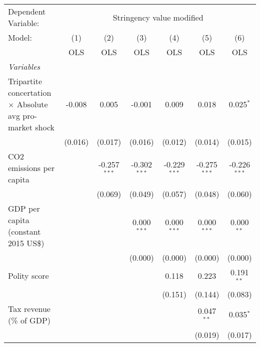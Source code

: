 
\begingroup
\centering
\begin{tabular}{lcccccc}
   \toprule
   Dependent Variable: & \multicolumn{6}{c}{Stringency value modified}\\
   Model:                                                          & (1)     & (2)            & (3)            & (4)            & (5)            & (6)\\  
                                                                   &  OLS    & OLS            & OLS            & OLS            & OLS            & OLS\\  
   \midrule
   \emph{Variables}\\
   Tripartite concertation $\times$ Absolute avg pro-market shock  & -0.008  & 0.005          & -0.001         & 0.009          & 0.018          & 0.025$^{*}$\\   
                                                                   & (0.016) & (0.017)        & (0.016)        & (0.012)        & (0.014)        & (0.015)\\   
   CO2 emissions per capita                                        &         & -0.257$^{***}$ & -0.302$^{***}$ & -0.229$^{***}$ & -0.275$^{***}$ & -0.226$^{***}$\\   
                                                                   &         & (0.069)        & (0.049)        & (0.057)        & (0.048)        & (0.060)\\   
   GDP per capita (constant 2015 US\$)                             &         &                & 0.000$^{***}$  & 0.000$^{***}$  & 0.000$^{***}$  & 0.000$^{**}$\\   
                                                                   &         &                & (0.000)        & (0.000)        & (0.000)        & (0.000)\\   
   Polity score                                                    &         &                &                & 0.118          & 0.223          & 0.191$^{**}$\\   
                                                                   &         &                &                & (0.151)        & (0.144)        & (0.083)\\   
   Tax revenue (\% of GDP)                                         &         &                &                &                & 0.047$^{**}$   & 0.035$^{*}$\\   
                                                                   &         &                &                &                & (0.019)        & (0.017)\\   

\end{tabular}
